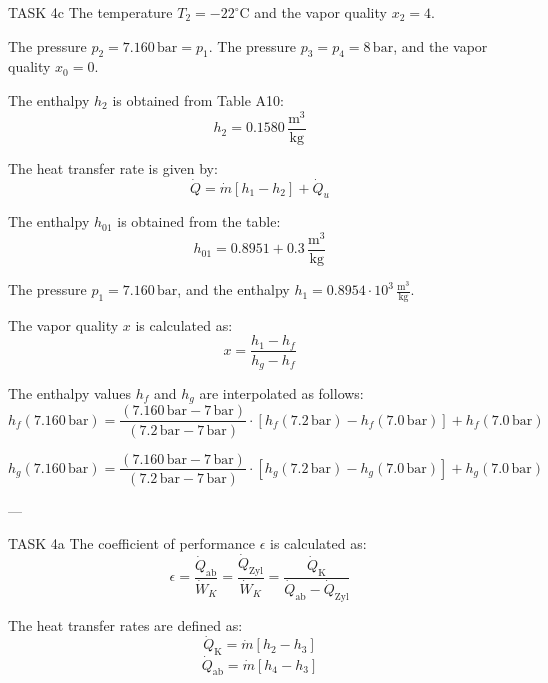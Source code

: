 TASK 4c  
The temperature \( T_2 = -22^\circ \text{C} \) and the vapor quality \( x_2 = 4 \).  

The pressure \( p_2 = 7.160 \, \text{bar} = p_1 \).  
The pressure \( p_3 = p_4 = 8 \, \text{bar} \), and the vapor quality \( x_0 = 0 \).  

The enthalpy \( h_2 \) is obtained from Table A10:  
\[
h_2 = 0.1580 \, \frac{\text{m}^3}{\text{kg}}
\]  

The heat transfer rate is given by:  
\[
\dot{Q} = \dot{m} \left[ h_1 - h_2 \right] + \dot{Q}_u
\]  

The enthalpy \( h_{01} \) is obtained from the table:  
\[
h_{01} = 0.8951 + 0.3 \, \frac{\text{m}^3}{\text{kg}}
\]  

The pressure \( p_1 = 7.160 \, \text{bar} \), and the enthalpy \( h_1 = 0.8954 \cdot 10^3 \, \frac{\text{m}^3}{\text{kg}} \).  

The vapor quality \( x \) is calculated as:  
\[
x = \frac{h_1 - h_f}{h_g - h_f}
\]  

The enthalpy values \( h_f \) and \( h_g \) are interpolated as follows:  
\[
h_f (7.160 \, \text{bar}) = \frac{(7.160 \, \text{bar} - 7 \, \text{bar})}{(7.2 \, \text{bar} - 7 \, \text{bar})} \cdot \left[ h_f (7.2 \, \text{bar}) - h_f (7.0 \, \text{bar}) \right] + h_f (7.0 \, \text{bar})
\]  

\[
h_g (7.160 \, \text{bar}) = \frac{(7.160 \, \text{bar} - 7 \, \text{bar})}{(7.2 \, \text{bar} - 7 \, \text{bar})} \cdot \left[ h_g (7.2 \, \text{bar}) - h_g (7.0 \, \text{bar}) \right] + h_g (7.0 \, \text{bar})
\]  

---

TASK 4a  
The coefficient of performance \( \epsilon \) is calculated as:  
\[
\epsilon = \frac{\dot{Q}_{\text{ab}}}{\dot{W}_K} = \frac{\dot{Q}_{\text{Zyl}}}{\dot{W}_K} = \frac{\dot{Q}_{\text{K}}}{\dot{Q}_{\text{ab}} - \dot{Q}_{\text{Zyl}}}
\]  

The heat transfer rates are defined as:  
\[
\dot{Q}_{\text{K}} = \dot{m} \left[ h_2 - h_3 \right]
\]  
\[
\dot{Q}_{\text{ab}} = \dot{m} \left[ h_4 - h_3 \right]
\]  
